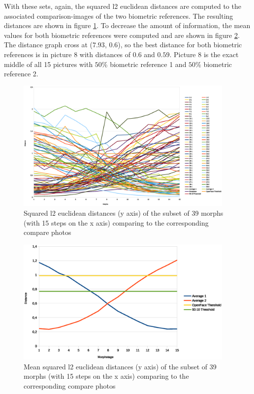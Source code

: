 With these sets, again, the squared l2 euclidean distances are computed to the associated comparison-images of the two biometric references. The resulting distances are shown in figure \ref{fig:Result39-all}. To decrease the amount of information, the mean values for both biometric references were computed and are shown in figure \ref{fig:Result39-mean}. The distance graph cross at ($7.93$, $0.6$), so the best distance for both biometric references is in picture 8 with distances of $0.6$ and $0.59$. Picture 8 is the exact middle of all 15 pictures with $50$\% biometric reference 1 and $50$\% biometric reference 2.
\begin{figure}[htbp] 
	\centering
		\includegraphics[width=0.95\textwidth]{Resources/result39-allODF.eps}
	\caption{Squared l2 euclidean distances (y axis) of the subset of 39 morphs (with 15 steps on the x axis) comparing to the corresponding compare photos}
	\label{fig:Result39-all}
\end{figure}
\begin{figure}[htbp] 
	\centering
		\includegraphics[width=0.95\textwidth]{Resources/result39-meanODF.eps}
	\caption{Mean squared l2 euclidean distances (y axis) of the subset of 39 morphs (with 15 steps on the x axis) comparing to the corresponding compare photos}
	\label{fig:Result39-mean}
\end{figure}


